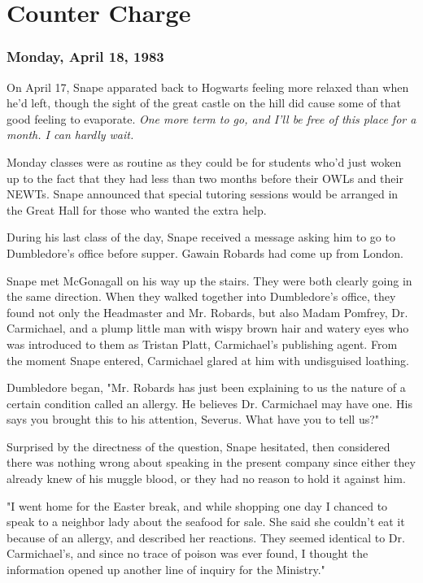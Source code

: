 
\chapter{Counter Charge}

\subsection{Monday, April 18, 1983}

On April 17, Snape apparated back to Hogwarts feeling more relaxed than when he'd left, though the sight of the great castle on the hill did cause some of that good feeling to evaporate. \emph{One more term to go, and I'll be free of this place for a month. I can hardly wait.}

Monday classes were as routine as they could be for students who'd just woken up to the fact that they had less than two months before their OWLs and their NEWTs. Snape announced that special tutoring sessions would be arranged in the Great Hall for those who wanted the extra help.

During his last class of the day, Snape received a message asking him to go to Dumbledore's office before supper. Gawain Robards had come up from London.

Snape met McGonagall on his way up the stairs. They were both clearly going in the same direction. When they walked together into Dumbledore's office, they found not only the Headmaster and Mr. Robards, but also Madam Pomfrey, Dr. Carmichael, and a plump little man with wispy brown hair and watery eyes who was introduced to them as Tristan Platt, Carmichael's publishing agent. From the moment Snape entered, Carmichael glared at him with undisguised loathing.

Dumbledore began, "Mr. Robards has just been explaining to us the nature of a certain condition called an allergy. He believes Dr. Carmichael may have one. His says you brought this to his attention, Severus. What have you to tell us?"

Surprised by the directness of the question, Snape hesitated, then considered there was nothing wrong about speaking in the present company since either they already knew of his muggle blood, or they had no reason to hold it against him.

"I went home for the Easter break, and while shopping one day I chanced to speak to a neighbor lady about the seafood for sale. She said she couldn't eat it because of an allergy, and described her reactions. They seemed identical to Dr. Carmichael's, and since no trace of poison was ever found, I thought the information opened up another line of inquiry for the Ministry."

